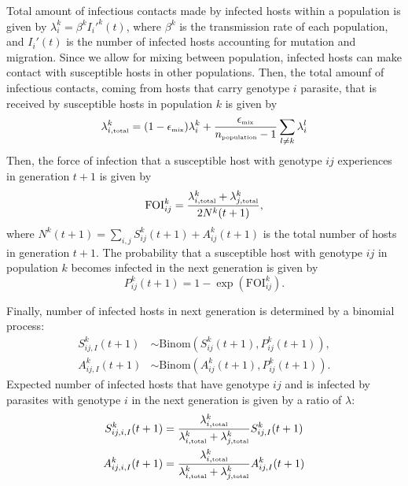 \documentclass{article}\usepackage[]{graphicx}\usepackage[]{color}
\begin{document}
Total amount of infectious contacts made by infected hosts within a population is given by $\lambda_i^k = \beta^k {I_i'}^k(t)$, where $\beta^k$ is the transmission rate of each population, and $I_i'(t)$ is the number of infected hosts accounting for mutation and migration.  
Since we allow for mixing between population, infected hosts can make contact with susceptible hosts in other populations.
Then, the total amounf of infectious contacts, coming from hosts that carry genotype $i$ parasite, that is received by susceptible hosts in population $k$ is given by
\begin{equation}
\lambda_{i, \textrm{\tiny total}}^k = (1 - \epsilon_{\textrm{\tiny mix}}) \lambda_i^k + \frac{\epsilon_{\textrm{\tiny mix}}}{n_\textrm{\tiny population}-1} \sum_{l \neq k} \lambda_i^l
\end{equation}
Then, the force of infection that a susceptible host with genotype $ij$ experiences in generation $t+1$ is given by
\begin{equation}
\mathrm{FOI}_{ij}^k = \frac{\lambda_{i, \textrm{\tiny total}}^k  + \lambda_{j, \textrm{\tiny total}}^k}{2 N^k(t+1)},
\end{equation}
where $N^k(t+1) = \sum_{i,j} S_{ij}^k(t+1) + A_{ij}^k(t+1)$ is the total number of hosts in generation $t+1$.
The probability that a susceptible host with genotype $ij$ in population $k$ becomes infected in the next generation is given by
\begin{equation}
P_{ij}^k(t+1) = 1 - \exp\left(\mathrm{FOI}_{ij}^k\right).
\end{equation}

Finally, number of infected hosts in next generation is determined by a binomial process:
\begin{equation}
\begin{aligned}
S_{ij,I}^k (t+1) &\sim \mathrm{Binom}(S_{ij}^k (t+1), P_{ij}^k(t+1)),\\
A_{ij,I}^k (t+1) &\sim \mathrm{Binom}(A_{ij}^k (t+1), P_{ij}^k(t+1)).
\end{aligned}
\end{equation}
Expected number of infected hosts that have genotype $ij$ and is infected by parasites with genotype $i$ in the next generation is given by a ratio of $\lambda$:
\begin{equation}
\begin{aligned}
S_{ij,i,I}^k(t+1) &= \frac{\lambda_{i, \textrm{\tiny total}}^k}{\lambda_{i, \textrm{\tiny total}}^k + \lambda_{j, \textrm{\tiny total}}^k} S_{ij,I}^k(t+1)\\
A_{ij,i,I}^k(t+1) &= \frac{\lambda_{i, \textrm{\tiny total}}^k}{\lambda_{i, \textrm{\tiny total}}^k + \lambda_{j, \textrm{\tiny total}}^k} A_{ij,I}^k(t+1)
\end{aligned}
\end{equation}
\end{document}
